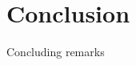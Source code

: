 \graphicspath{{img/chapter_6/}}

\chapter{Conclusion }
\label{chapter:conclusion}

\begin{synopsis}
  Concluding remarks
\end{synopsis}
